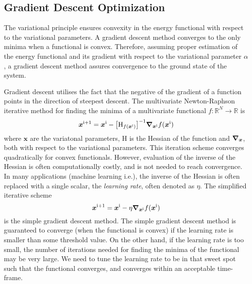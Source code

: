 \subsection{Gradient Descent Optimization}\label{sec:gradient_descent}

The variational principle ensures convexity in the energy functional with respect to the variational parameters. A gradient descent method converges to the only minima when a functional is convex. Therefore, assuming proper estimation of the energy functional and its gradient with respect to the variational parameter $\alpha$, a gradient descent method assures convergence to the ground state of the system. 


Gradient descent utilises the fact that the negative of the gradient of a function points in the direction of steepest descent. The multivariate Newton-Raphson iterative method for finding the minima of a multivariate functional $f:\mathbb{R}^N\to\mathbb{R}$ is   
\begin{equation}
    \bm{x}^{\mathrm{i}+1} = \bm{x}^{\mathrm{i}} - \qty[\mathrm{H}_{f(\bm{x}^{\mathrm{i}})}]^{-1}\grad_{\bm{x}^{\mathrm{i}}} f(\bm{x}^{\mathrm{i}})
\end{equation}
where $\bm{x}$ are the variatonal parameters, $\mathrm{H}$ is the Hessian of the function and $\grad_{\bm{x}}$, both with respect to the variational parameters. This iteration scheme converges quadratically for convex functionals. However, evaluation of the inverse of the Hessian is often computationally costly, and is not needed to reach convergence. In many applications (machine learning i.e.), the inverse of the Hessian is often replaced with a single scalar, the \textit{learning rate}, often denoted as $\eta$. The simplified iterative scheme 
\begin{equation}
    \bm{x}^{\mathrm{i}+1} = \bm{x}^{\mathrm{i}} - \eta\grad_{\bm{x}^{\mathrm{i}}} f(\bm{x}^{\mathrm{i}})
\end{equation}
is the simple gradient descent method. The simple gradient descent method is guaranteed to converge (when the functional is convex) if the learning rate is smaller than some threshold value. On the other hand, if the learning rate is too small, the number of iterations needed for finding the minima of the functional may be very large. We need to tune the learning rate to be in that sweet spot such that the functional converges, and converges within an acceptable time-frame.

